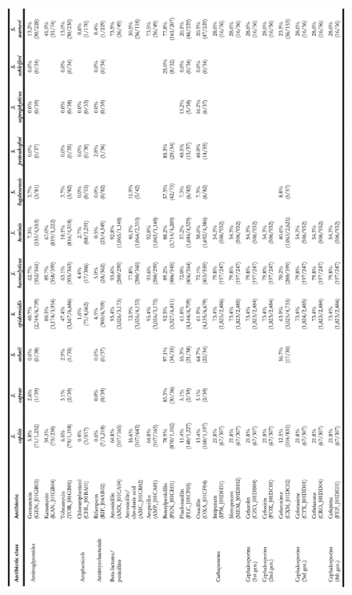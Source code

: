 \documentclass[
]{book}
\begin{document}
\begin{figure}

{\centering \includegraphics[width=1\linewidth]{images/07-t04} 

}

\end{figure}
\end{document}
